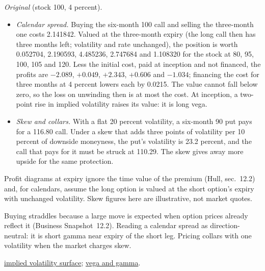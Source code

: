\begin{qfmethod}
\emph{Original} (stock 100, 4 percent).
\begin{itemize}
\item \emph{Calendar spread.} Buying the six-month 100 call and selling the three-month one costs 2.141842. Valued at the three-month expiry (the long call then has three months left; volatility and rate unchanged), the position is worth 0.052704, 2.190593, 4.485236, 2.747684 and 1.108320 for the stock at 80, 95, 100, 105 and 120. Less the initial cost, paid at inception and not financed, the profits are $-2.089$, $+0.049$, $+2.343$, $+0.606$ and $-1.034$; financing the cost for three months at 4 percent lowers each by 0.0215. The value cannot fall below zero, so the loss on unwinding then is at most the cost. At inception, a two-point rise in implied volatility raises its value: it is long vega.
\item \emph{Skew and collars.} With a flat 20 percent volatility, a six-month 90 put pays for a 116.80 call. Under a skew that adds three points of volatility per 10 percent of downside moneyness, the put's volatility is 23.2 percent, and the call that pays for it must be struck at 110.29. The skew gives away more upside for the same protection.
\end{itemize}

 Profit diagrams at expiry ignore the time value of the premium (Hull, sec.~12.2) and, for calendars, assume the long option is valued at the short option's expiry with unchanged volatility. Skew figures here are illustrative, not market quotes.

 Buying straddles because a large move is expected when option prices already reflect it (Business Snapshot~12.2). Reading a calendar spread as direction-neutral: it is short gamma near expiry of the short leg. Pricing collars with one volatility when the market charges skew.

 \hyperref[def:implied-volatility-surface]{implied volatility surface}; \hyperref[meth:greeks-delta-gamma-hedging]{vega and gamma}.

\end{qfmethod}

